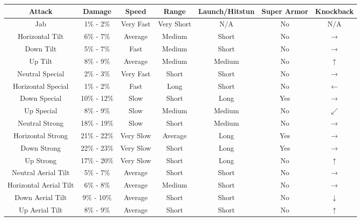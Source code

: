 \begin{table}[h!]
    \centering
    \begin{tabular}{| c | c | c | c | c | c | c |}
        \hline
        \textbf{Attack} & \textbf{Damage} & \textbf{Speed} & \textbf{Range} & \textbf{Launch/Hitstun} & \textbf{Super Armor} & \textbf{Knockback} \\
        \hline
        Jab & 1\% - 2\% & Very Fast & Very Short & N/A & No & N/A \\
        \hline
        Horizontal Tilt & 6\% - 7\% & Average & Medium & Short & No & $\rightarrow$ \\
        \hline
        Down Tilt & 5\% - 7\% & Fast & Medium & Short & No & $\rightarrow$ \\
        \hline
        Up Tilt & 8\% - 9\% & Average & Medium & Medium & No & $\uparrow$ \\
        \hline
        Neutral Special & 2\% - 3\% & Very Fast & Short & Short & No & $\rightarrow$ \\
        \hline
        Horizontal Special & 1\% - 2\% & Fast & Long & Short & No & $\leftarrow$ \\
        \hline
        Down Special & 10\% - 12\% & Slow & Short & Long & Yes & $\rightarrow$ \\
        \hline
        Up Special & 8\% - 9\% & Slow & Medium & Medium & No & $\swarrow$ \\
        \hline
        Neutral Strong & 18\% - 19\% & Slow & Short & Medium & No & $\rightarrow$ \\
        \hline
        Horizontal Strong & 21\% - 22\% & Very Slow & Average & Long & Yes & $\rightarrow$ \\
        \hline
        Down Strong & 22\% - 23\% & Very Slow & Short & Long & Yes & $\rightarrow$ \\
        \hline
        Up Strong & 17\% - 20\% & Very Slow & Short & Long & No & $\uparrow$ \\
        \hline
        Neutral Aerial Tilt & 5\% - 7\% & Average & Short & Short & No & $\rightarrow$ \\
        \hline
        Horizontal Aerial Tilt & 6\% - 8\% & Average & Medium & Short & No & $\rightarrow$ \\
        \hline
        Down Aerial Tilt & 9\% - 10\% & Average & Short & Short & No & $\downarrow$ \\
        \hline
        Up Aerial Tilt & 8\% - 9\% & Average & Short & Short & No & $\uparrow$ \\
        \hline

\end{tabular}
\end{table}
